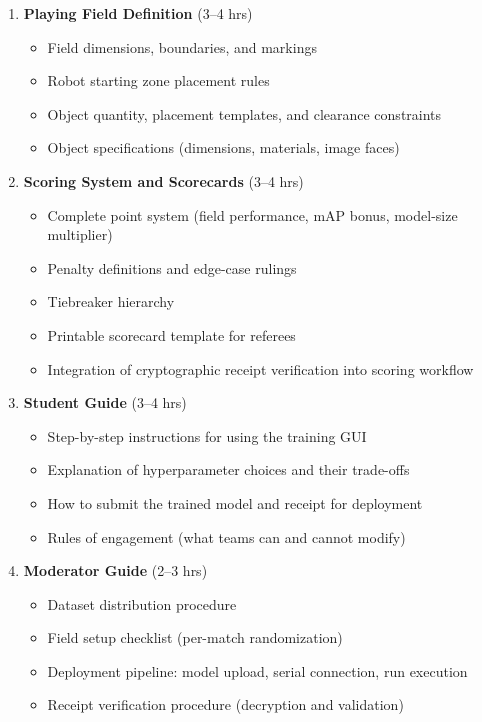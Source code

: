 \documentclass[a4paper]{article}
\begin{document}
\begin{enumerate}[leftmargin=*]
    \item \textbf{Playing Field Definition} (3--4 hrs)
    \begin{itemize}
        \item Field dimensions, boundaries, and markings
        \item Robot starting zone placement rules
        \item Object quantity, placement templates, and clearance constraints
        \item Object specifications (dimensions, materials, image faces)
    \end{itemize}

    \item \textbf{Scoring System and Scorecards} (3--4 hrs)
    \begin{itemize}
        \item Complete point system (field performance, mAP bonus, model-size multiplier)
        \item Penalty definitions and edge-case rulings
        \item Tiebreaker hierarchy
        \item Printable scorecard template for referees
        \item Integration of cryptographic receipt verification into scoring workflow
    \end{itemize}

    \item \textbf{Student Guide} (3--4 hrs)
    \begin{itemize}
        \item Step-by-step instructions for using the training GUI
        \item Explanation of hyperparameter choices and their trade-offs
        \item How to submit the trained model and receipt for deployment
        \item Rules of engagement (what teams can and cannot modify)
    \end{itemize}

    \item \textbf{Moderator Guide} (2--3 hrs)
    \begin{itemize}
        \item Dataset distribution procedure
        \item Field setup checklist (per-match randomization)
        \item Deployment pipeline: model upload, serial connection, run execution
        \item Receipt verification procedure (decryption and validation)
    \end{itemize}


\end{enumerate}
\end{document}
